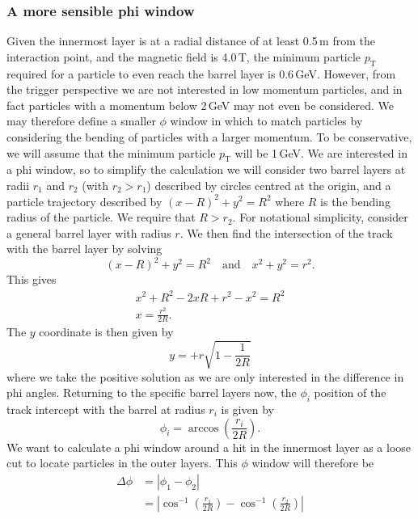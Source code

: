\documentclass[a4paper, 12pt]{article}
\newcommand{\pt}{\ensuremath{p_{\mathrm{T}}}\xspace}
\begin{document}
\subsubsection{A more sensible phi window}
Given the innermost layer is at a radial distance of at least 0.5\,m from the interaction point, 
and the magnetic field is 4.0\,T, the minimum particle \pt required for a particle to even reach the barrel layer is 0.6\,GeV.
However, from the trigger perspective we are not interested in low momentum particles, and in fact particles with a momentum below 2\,GeV may not even be considered. 
We may therefore define a smaller $\phi$ window in which to match particles by considering the bending of particles with a larger momentum.
To be conservative, we will assume that the minimum particle \pt will be 1\,GeV.
We are interested in a phi window, so to simplify the calculation we will consider two barrel layers at radii $r_1$ and $r_2$ (with $r_2 > r_1$) described by circles centred at the origin, and a particle trajectory
described by $(x-R)^2 + y^2 = R^2$ where $R$ is the bending radius of the particle.
We require that $R > r_2$.  
For notational simplicity, consider a general barrel layer with radius $r$. 
We then find the intersection of the track with the barrel layer by solving
\begin{equation}
  (x-R)^2 + y^2 = R^2 \quad \mathrm{and} \quad x^2 + y^2 = r^2.
\end{equation}
This gives
\begin{align}
  x^2 + R^2 - 2xR + r^2 - x^2 = R^2 \\
  x = \frac{r^2}{2R}.
\end{align}
The $y$ coordinate is then given by
\begin{equation}
  y = +r\sqrt{1-\frac{1}{2R}}
\end{equation}
where we take the positive solution as we are only interested in the difference in phi angles.
Returning to the specific barrel layers now, the $\phi_i$ position of the track intercept with the barrel at radius $r_i$ is given by 
\begin{equation}
  \phi_i = \arccos \left( \frac{r_i}{2R} \right).
\end{equation}
We want to calculate a phi window around a hit in the innermost layer as a loose cut to locate particles in the outer layers. 
This $\phi$ window will therefore be
\begin{align}
\Delta \phi & = | \phi_1 - \phi_2 | \\
  & =  \left| \cos^{-1} \left( \frac{r_1}{2R} \right) - \cos^{-1} \left( \frac{r_2}{2R} \right) \right| 
\end{align}
\end{document}
